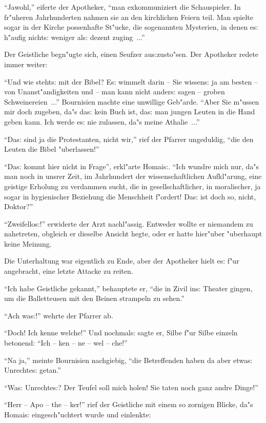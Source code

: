 \documentclass[oneside,12pt]{book}
\newcommand{\s}{s:}%
\begin{document}
"`Jawohl,"' eiferte der Apotheker, "`man exkommuniziert die
Schauspieler. In fr"uheren Jahrhunderten nahmen sie an den
kirchlichen Feiern teil. Man spielte sogar in der Kirche
possenhafte St"ucke, die sogenannten Mysterien, in denen e{\s}
h"aufig nicht{\s} weniger al{\s} dezent zuging~..."'

Der Geistliche begn"ugte sich, einen Seufzer au{\s}zusto"sen. Der
Apotheker redete immer weiter:

"`Und wie steht{\s} mit der Bibel? E{\s} wimmelt darin -- Sie
wissen{\s} ja am besten -- von Unanst"andigkeiten und -- man kann
nicht ander{\s} sagen -- groben Schweinereien~..."' Bournisien
machte eine unwillige Geb"arde. "`Aber Sie m"ussen mir doch
zugeben, da"s da{\s} kein Buch ist, da{\s} man jungen Leuten in
die Hand geben kann. Ich werde e{\s} nie zulassen, da"s meine
Athalie~..."'

"`Da{\s} sind ja die Protestanten, nicht wir,"' rief der Pfarrer
ungeduldig, "`die den Leuten die Bibel "uberlassen!"'

"`Da{\s} kommt hier nicht in Frage"', erkl"arte Homai{\s}. "`Ich
wundre mich nur, da"s man noch in unsrer Zeit, im Jahrhundert der
wissenschaftlichen Aufkl"arung, eine geistige Erholung zu
verdammen sucht, die in gesellschaftlicher, in moralischer, ja
sogar in hygienischer Beziehung die Menschheit f"ordert! Da{\s}
ist doch so, nicht, Doktor?"'

"`Zweifello{\s}!"' erwiderte der Arzt nachl"assig. Entweder wollte
er niemandem zu nahetreten, obgleich er dieselbe Ansicht hegte,
oder er hatte hier"uber "uberhaupt keine Meinung.

Die Unterhaltung war eigentlich zu Ende, aber der Apotheker hielt
e{\s} f"ur angebracht, eine letzte Attacke zu reiten.

"`Ich habe Geistliche gekannt,"' behauptete er, "`die in Zivil
in{\s} Theater gingen, um die Balletteusen mit den Beinen
strampeln zu sehen."'

"`Ach wa{\s}!"' wehrte der Pfarrer ab.

"`Doch! Ich kenne welche!"' Und nochmal{\s} sagte er, Silbe f"ur
Silbe einzeln betonend: "`Ich -- ken -- ne -- wel -- che!"'

"`Na ja,"' meinte Bournisien nachgiebig, "`die Betreffenden haben
da aber etwa{\s} Unrechte{\s} getan."'

"`Wa{\s} Unrechte{\s}? Der Teufel soll mich holen! Sie taten noch
ganz andre Dinge!"'

"`Herr -- Apo -- the -- ker!"' rief der Geistliche mit einem so
zornigen Blicke, da"s Homai{\s} eingesch"uchtert wurde und
einlenkte:
\end{document}
